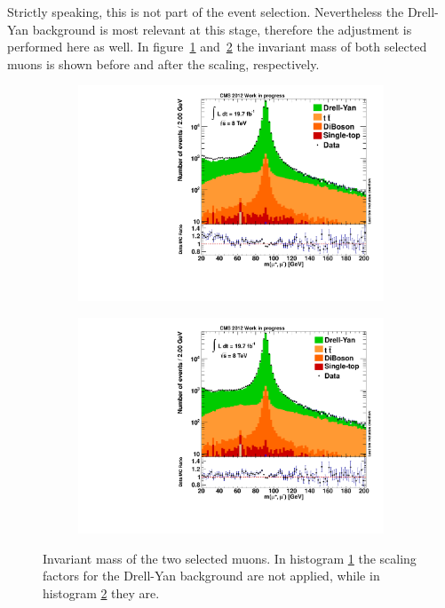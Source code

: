 Strictly speaking, this is not part of the event selection. Nevertheless the Drell-Yan background is most relevant at this stage, therefore the adjustment is performed here as well. In figure~\ref{fig:m_mumu_zpeak_nodysf} and~\ref{fig:m_mumu_zpeak} the invariant mass of both selected muons is shown before and after the scaling, respectively.

\begin{figure}[htb!]
  \centering
  \begin{subfigure}[b]{0.495\textwidth}
    \centering
    \includegraphics[width=\textwidth]{plots/m_mumu_zpeak_nodysf.pdf}
    \caption{\label{fig:m_mumu_zpeak_nodysf}}
  \end{subfigure}
  \begin{subfigure}[b]{0.495\textwidth}
    \centering
    \includegraphics[width=\textwidth]{plots/m_mumu_zpeak.pdf}
    \caption{\label{fig:m_mumu_zpeak}}
  \end{subfigure}
  \caption{Invariant mass of the two selected muons. In histogram \ref{fig:m_mumu_zpeak_nodysf} the scaling factors for the Drell-Yan background are not applied, while in histogram \ref{fig:m_mumu_zpeak} they are.}
  \label{fig:dyscaling}
\end{figure}

